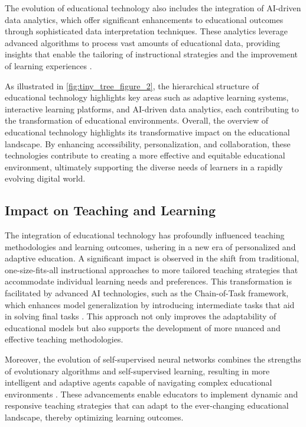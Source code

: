 The evolution of educational technology also includes the integration of AI-driven data analytics, which offer significant enhancements to educational outcomes through sophisticated data interpretation techniques. These analytics leverage advanced algorithms to process vast amounts of educational data, providing insights that enable the tailoring of instructional strategies and the improvement of learning experiences \cite{oh2024generativeaiparadoxevaluation}.

As illustrated in \autoref{fig:tiny_tree_figure_2}, the hierarchical structure of educational technology highlights key areas such as adaptive learning systems, interactive learning platforms, and AI-driven data analytics, each contributing to the transformation of educational environments. Overall, the overview of educational technology highlights its transformative impact on the educational landscape. By enhancing accessibility, personalization, and collaboration, these technologies contribute to creating a more effective and equitable educational environment, ultimately supporting the diverse needs of learners in a rapidly evolving digital world.


\subsection{Impact on Teaching and Learning} \label{subsec:Impact on Teaching and Learning}



The integration of educational technology has profoundly influenced teaching methodologies and learning outcomes, ushering in a new era of personalized and adaptive education. A significant impact is observed in the shift from traditional, one-size-fits-all instructional approaches to more tailored teaching strategies that accommodate individual learning needs and preferences. This transformation is facilitated by advanced AI technologies, such as the Chain-of-Task framework, which enhances model generalization by introducing intermediate tasks that aid in solving final tasks \cite{li2023ecomgptinstructiontuninglargelanguage}. This approach not only improves the adaptability of educational models but also supports the development of more nuanced and effective teaching methodologies.



Moreover, the evolution of self-supervised neural networks combines the strengths of evolutionary algorithms and self-supervised learning, resulting in more intelligent and adaptive agents capable of navigating complex educational environments \cite{le2019evolvingselfsupervisedneuralnetworks}. These advancements enable educators to implement dynamic and responsive teaching strategies that can adapt to the ever-changing educational landscape, thereby optimizing learning outcomes.



